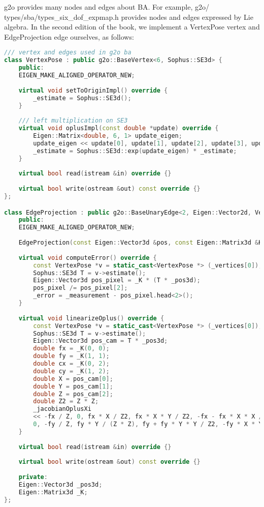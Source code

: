 g2o provides many nodes and edges about BA. For example, g2o/\\types/sba/types\_six\_dof\_expmap.h provides nodes and edges expressed by Lie algebra. In the second edition of the book, we implement a VertexPose vertex and EdgeProjection edge ourselves, as follows:
\begin{lstlisting}[language=c++,caption=slambook2/ch7/pose_estimation_3d2d.cpp（片段）]
/// vertex and edges used in g2o ba
class VertexPose : public g2o::BaseVertex<6, Sophus::SE3d> {
	public:
	EIGEN_MAKE_ALIGNED_OPERATOR_NEW;
	
	virtual void setToOriginImpl() override {
		_estimate = Sophus::SE3d();
	}
	
	/// left multiplication on SE3
	virtual void oplusImpl(const double *update) override {
		Eigen::Matrix<double, 6, 1> update_eigen;
		update_eigen << update[0], update[1], update[2], update[3], update[4], update[5];
		_estimate = Sophus::SE3d::exp(update_eigen) * _estimate;
	}
	
	virtual bool read(istream &in) override {}
	
	virtual bool write(ostream &out) const override {}
};

class EdgeProjection : public g2o::BaseUnaryEdge<2, Eigen::Vector2d, VertexPose> {
	public:
	EIGEN_MAKE_ALIGNED_OPERATOR_NEW;
	
	EdgeProjection(const Eigen::Vector3d &pos, const Eigen::Matrix3d &K) : _pos3d(pos), _K(K) {}
	
	virtual void computeError() override {
		const VertexPose *v = static_cast<VertexPose *> (_vertices[0]);
		Sophus::SE3d T = v->estimate();
		Eigen::Vector3d pos_pixel = _K * (T * _pos3d);
		pos_pixel /= pos_pixel[2];
		_error = _measurement - pos_pixel.head<2>();
	}
	
	virtual void linearizeOplus() override {
		const VertexPose *v = static_cast<VertexPose *> (_vertices[0]);
		Sophus::SE3d T = v->estimate();
		Eigen::Vector3d pos_cam = T * _pos3d;
		double fx = _K(0, 0);
		double fy = _K(1, 1);
		double cx = _K(0, 2);
		double cy = _K(1, 2);
		double X = pos_cam[0];
		double Y = pos_cam[1];
		double Z = pos_cam[2];
		double Z2 = Z * Z;
		_jacobianOplusXi
		<< -fx / Z, 0, fx * X / Z2, fx * X * Y / Z2, -fx - fx * X * X / Z2, fx * Y / Z,
		0, -fy / Z, fy * Y / (Z * Z), fy + fy * Y * Y / Z2, -fy * X * Y / Z2, -fy * X / Z;
	}
	
	virtual bool read(istream &in) override {}
	
	virtual bool write(ostream &out) const override {}
	
	private:
	Eigen::Vector3d _pos3d;
	Eigen::Matrix3d _K;
};
\end{lstlisting}

